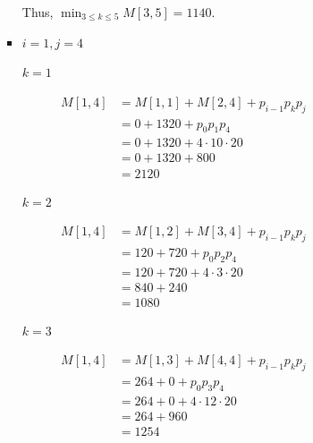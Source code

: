 \documentclass[12pt]{article}
\begin{document}
\begin{enumerate}[1.]
\begin{itemize}
\begin{itemize}
\begin{enumerate}[1.]
\begin{enumerate}[1)]
\begin{itemize}
                        \bigskip

                        Thus, $\min_{3 \leq k \leq 5} M[3,5] = 1140$.


                        \item $i = 1, j = 4$

                        \bigskip

                        \underline{$k = 1$}

                        \begin{align}
                            M[1,4] &= M[1,1] + M[2,4] + p_{i-1}p_kp_j\\
                            &= 0 + 1320 + p_0p_1p_4\\
                            &= 0 + 1320 + 4 \cdot 10 \cdot 20\\
                            &= 0 + 1320 + 800\\
                            &= 2120
                        \end{align}

                        \bigskip

                        \underline{$k = 2$}

                        \begin{align}
                            M[1,4] &= M[1,2] + M[3,4] + p_{i-1}p_kp_j\\
                            &= 120 + 720 + p_0p_2p_4\\
                            &= 120 + 720 + 4 \cdot 3 \cdot 20\\
                            &= 840 + 240\\
                            &= 1080
                        \end{align}

                        \bigskip

                        \underline{$k = 3$}

                        \begin{align}
                            M[1,4] &= M[1,3] + M[4,4] + p_{i-1}p_kp_j\\
                            &= 264 + 0 + p_0p_3p_4\\
                            &= 264 + 0 + 4 \cdot 12 \cdot 20\\
                            &= 264 + 960\\
                            &= 1254
                        \end{align}


\end{itemize}
\end{enumerate}
\end{enumerate}
\end{itemize}
\end{itemize}
\end{enumerate}
\end{document}
